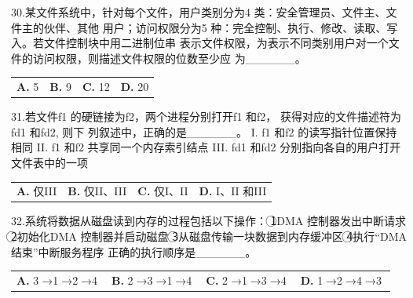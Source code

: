 \documentclass[UTF8,11pt]{ctexart}
\begin{document}
30.某文件系统中，针对每个文件，用户类别分为4 类：安全管理员、文件主、文件主的伙伴、其他 用户；访问权限分为5 种：完全控制、执行、修改、读取、写入。若文件控制块中用二进制位串 表示文件权限，为表示不同类别用户对一个文件的访问权限，则描述文件权限的位数至少应 为\_\_\_\_\_\_。


\begin{center}\begin{tabular}{>{\raggedright\arraybackslash}p{\dimexpr(\linewidth-8\tabcolsep)/4\relax}>{\raggedright\arraybackslash}p{\dimexpr(\linewidth-8\tabcolsep)/4\relax}>{\raggedright\arraybackslash}p{\dimexpr(\linewidth-8\tabcolsep)/4\relax}>{\raggedright\arraybackslash}p{\dimexpr(\linewidth-8\tabcolsep)/4\relax}}
\textbf{A.} 5 & \textbf{B.} 9 & \textbf{C.} 12 & \textbf{D.} 20\\[.35em]\end{tabular}\end{center}

31.若文件f1 的硬链接为f2，两个进程分别打开f1 和f2， 获得对应的文件描述符为fd1 和fd2, 则下 列叙述中，正确的是\_\_\_\_\_\_。 I. f1 和f2 的读写指针位置保持相同 II. f1 和f2 共享同一个内存索引结点 III. fd1 和fd2 分别指向各自的用户打开文件表中的一项


\begin{center}\begin{tabular}{>{\raggedright\arraybackslash}p{\dimexpr(\linewidth-8\tabcolsep)/4\relax}>{\raggedright\arraybackslash}p{\dimexpr(\linewidth-8\tabcolsep)/4\relax}>{\raggedright\arraybackslash}p{\dimexpr(\linewidth-8\tabcolsep)/4\relax}>{\raggedright\arraybackslash}p{\dimexpr(\linewidth-8\tabcolsep)/4\relax}}
\textbf{A.} 仅III & \textbf{B.} 仅II、III & \textbf{C.} 仅I、II & \textbf{D.} I、II 和III\\[.35em]\end{tabular}\end{center}

32.系统将数据从磁盘读到内存的过程包括以下操作： \textcircled{1}DMA 控制器发出中断请求 \textcircled{2}初始化DMA 控制器并启动磁盘 \textcircled{3}从磁盘传输一块数据到内存缓冲区 \textcircled{4}执行“DMA 结束”中断服务程序 正确的执行顺序是\_\_\_\_\_\_。


\begin{center}\begin{tabular}{>{\raggedright\arraybackslash}p{\dimexpr(\linewidth-8\tabcolsep)/4\relax}>{\raggedright\arraybackslash}p{\dimexpr(\linewidth-8\tabcolsep)/4\relax}>{\raggedright\arraybackslash}p{\dimexpr(\linewidth-8\tabcolsep)/4\relax}>{\raggedright\arraybackslash}p{\dimexpr(\linewidth-8\tabcolsep)/4\relax}}
\textbf{A.} \textcircled{3}→\textcircled{1}→\textcircled{2}→\textcircled{4} & \textbf{B.} \textcircled{2}→\textcircled{3}→\textcircled{1}→\textcircled{4} & \textbf{C.} \textcircled{2}→\textcircled{1}→\textcircled{3}→\textcircled{4} & \textbf{D.} \textcircled{1}→\textcircled{2}→\textcircled{4}→\textcircled{3}\\[.35em]\end{tabular}\end{center}
\end{document}
